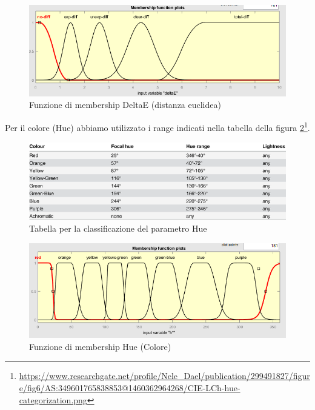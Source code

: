 \begin{figure}[!ht]
\begin{center}
	\includegraphics[scale=0.8]{images/rete2-membership-deltae.PNG}
\end{center}
\caption{Funzione di membership DeltaE (distanza euclidea)}
\label{fig:membdeltae}
\end{figure}

Per il colore (Hue) abbiamo utilizzato i range indicati nella tabella della figura \ref{fig:ciehue}\footnote{\url{https://www.researchgate.net/profile/Nele_Dael/publication/299491827/figure/fig6/AS:349601765838853@1460362964268/CIE-LCh-hue-categorization.png}}.
\begin{figure}[!ht]
\begin{center}
	\includegraphics[scale=2.5]{images/CIE-LCh-hue-categorization.png}
\end{center}
\caption{Tabella per la classificazione del parametro Hue}
\label{fig:ciehue}
\end{figure}

\begin{figure}[!ht]
\begin{center}
	\includegraphics[scale=0.8]{images/rete2-membership-colors.PNG}
\end{center}
\caption{Funzione di membership Hue (Colore)}
\label{fig:membcolor}
\end{figure}

